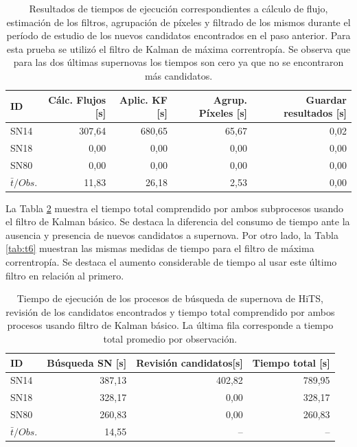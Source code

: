 \begin{table}[h!]
\centering
\caption{Resultados de tiempos de ejecuci\'on correspondientes a c\'alculo de flujo, estimaci\'on de los filtros, agrupaci\'on de p\'ixeles y filtrado de los mismos durante el per\'iodo de estudio de los nuevos candidatos encontrados en el paso anterior. Para esta prueba se utiliz\'o el filtro de Kalman de m\'axima correntrop\'ia. Se observa que para las dos \'ultimas supernovas los tiempos son cero ya que no se encontraron m\'as candidatos.}
\begin{tabular}{|l|r|r|r|r|}
\hline
\textbf{ID} & \textbf{C\'alc. Flujos [s]} & \textbf{Aplic. KF [s]} &  \textbf{Agrup. P\'ixeles [s]}  & \textbf{Guardar resultados [s]}\\ \hline \hline
SN14        & 307,64            & 680,65        &  65,67 & 0,02 \\ \hline
SN18            & 0,00             & 0,00         &  0,00  & 0,00\\ \hline
SN80            & 0,00             & 0,00         &   0,00 & 0,00 \\ \hline \hline
$\bar{t}/Obs. $& 11,83 & 26,18 & 2,53 & 0,00\\\hline  
\end{tabular}
\label{tab:t4}

\end{table}
\bigskip

La Tabla \ref{tab:t5} muestra el tiempo total comprendido por ambos subprocesos usando el filtro de Kalman b\'asico. Se destaca la diferencia del consumo de tiempo ante la ausencia y presencia de nuevos candidatos a supernova. Por otro lado, la Tabla \ref{tab:t6} muestran las mismas medidas de tiempo para el filtro de m\'axima correntrop\'ia. Se destaca el aumento considerable de tiempo al usar este \'ultimo filtro en relaci\'on al primero. 
  
\begin{table}[h!]
\centering
\caption{Tiempo de ejecuci\'on de los procesos de b\'usqueda de supernova de HiTS, revisi\'on de los candidatos encontrados y tiempo total comprendido por ambos procesos usando filtro de Kalman b\'asico. La \'ultima fila corresponde a tiempo total promedio por observaci\'on.}
\begin{tabular}{|l|r|r|r|}
\hline
\textbf{ID} & \textbf{B\'usqueda SN [s]} & \textbf{Revisi\'on candidatos[s]} & \textbf{Tiempo total [s]} \\ \hline
\hline
SN14 & 387,13 & 402,82 & 789,95 \\\hline
SN18 & 328,17 & 0,00 & 328,17\\\hline
SN80 & 260,83 & 0,00 & 260,83 \\\hline\hline
 $\bar{t}/Obs. $& 14,55 & -- & --\\\hline 
\end{tabular}
\label{tab:t5}
\end{table}


